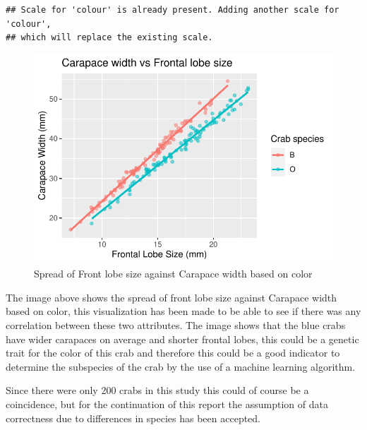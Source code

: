 \documentclass[
]{article}
\begin{document}
\begin{verbatim}
## Scale for 'colour' is already present. Adding another scale for 'colour',
## which will replace the existing scale.
\end{verbatim}

\begin{figure}[H]

{\centering \includegraphics{CrabProject_files/figure-latex/figure1-1} 

}

\caption{Spread of Front lobe size against Carapace width based on color}\label{fig:figure1}
\end{figure}

The image above shows the spread of front lobe size against Carapace
width based on color, this visualization has been made to be able to see
if there was any correlation between these two attributes. The image
shows that the blue crabs have wider carapaces on average and shorter
frontal lobes, this could be a genetic trait for the color of this crab
and therefore this could be a good indicator to determine the subspecies
of the crab by the use of a machine learning algorithm.

Since there were only 200 crabs in this study this could of course be a
coincidence, but for the continuation of this report the assumption of
data correctness due to differences in species has been accepted.
\end{document}
